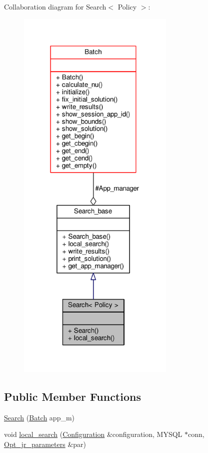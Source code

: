Collaboration diagram for Search$<$ Policy $>$\-:
\nopagebreak
\begin{figure}[H]
\begin{center}
\leavevmode
\includegraphics[width=213pt]{classSearch__coll__graph}
\end{center}
\end{figure}
\subsection*{Public Member Functions}
\begin{DoxyCompactItemize}
\item 
\hyperlink{classSearch_a59b826749138fdaa93c41b1e0697da58}{Search} (\hyperlink{classBatch}{Batch} app\-\_\-m)
\item 
void \hyperlink{classSearch_a32d434fae76c18149f8b15aedadc5f75}{local\-\_\-search} (\hyperlink{classConfiguration}{Configuration} \&configuration, M\-Y\-S\-Q\-L $\ast$conn, \hyperlink{classOpt__jr__parameters}{Opt\-\_\-jr\-\_\-parameters} \&par)
\end{DoxyCompactItemize}

